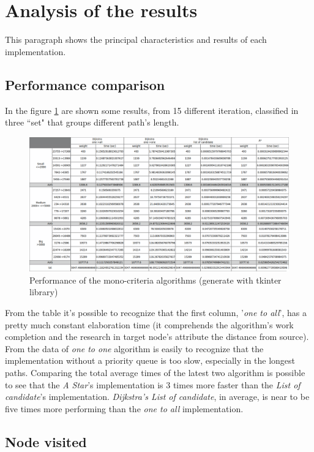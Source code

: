 \documentclass[a4paper,11pt]{report}
\begin{document}
\section{Analysis of the results}
This paragraph shows the principal characteristics and results of each implementation.
\subsection{Performance comparison} 
In the figure \ref{fig:monoCriteriaOutput} are shown some results, from 15 different iteration, classified in three ``set" that groups different path's length.
\begin{figure}[H]
	\centering
	\includegraphics[width=\linewidth]{monoCriteriaOutput.png}
	\caption{Performance of the mono-criteria algorithms (generate with tkinter library)}
	\label{fig:monoCriteriaOutput}
\end{figure}
From the table it's possible to recognize that the first column, '\textit{one to all}', has a pretty much constant elaboration time (it comprehends the algorithm's work completion and the research in target node's attribute the distance from source). From the data of \textit{one to one} algorithm is easily to recognize that the implementation without a priority queue is too slow, especially in the longest paths. Comparing the total average times of the latest two algorithm is possible to see that the \textit{A Star}'s implementation is 3 times more faster than the \textit{List of candidate}'s implementation.
\textit{Dijkstra's List of candidate}, in average, is near to be five times more performing than the \textit{one to all} implementation.

\subsection{Node visited}
\end{document}
